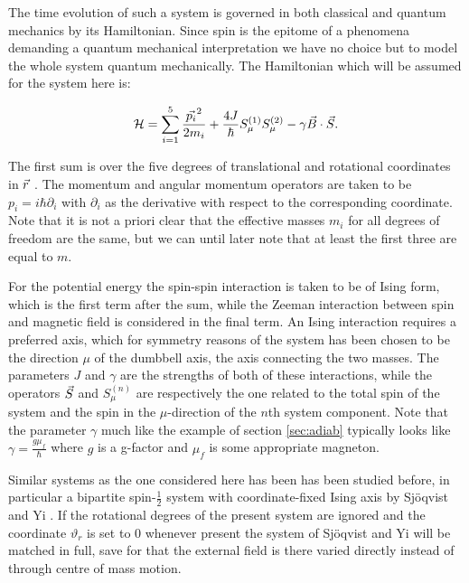 \documentclass[a4paper]{article}
\begin{document}
The time evolution of such a system is governed in both classical and quantum mechanics by
its Hamiltonian. Since spin is the epitome of a phenomena demanding a quantum mechanical
interpretation we have no choice but to model the whole system quantum mechanically. %
The Hamiltonian which will be assumed for the system here is:

\begin{equation}\label{eq:Hamil0}
        \mathbb{\cal H} = \sum_{i=1}^{5} \frac{\vec{p_i}^2}{2m_i} +
        \frac{4J}{\hbar{}}S^{(1)}_{\mu}S^{(2)}_{\mu} -
        \gamma\vec{B}\cdot \vec{S}.
\end{equation}

The first sum is over the five degrees of translational and rotational coordinates in \(\vec{r}\)
. The momentum and angular
momentum operators are
taken to be \(p_i = i\hbar \partial_i\label{def:mom}\) with \(\partial_i\) as the derivative with respect
to the
corresponding coordinate. Note that it is not a priori clear that the effective masses
\(m_i\) for
all degrees of freedom are the same, but we can until later note that at least the first
three are equal to \(m\).

For the potential energy the spin-spin interaction is taken to be of Ising form, which is
the first term after the sum, while the Zeeman interaction between spin and magnetic field is
considered in the final term. %
An Ising interaction requires a preferred axis, which for symmetry reasons
of the system has been chosen to be the direction \(\mu\) of the dumbbell axis, the axis connecting
the two masses.
 The parameters \(J\) and \(\gamma\) are the strengths of both
of these interactions, while the operators \(\vec{S}\) and \(S^{(n)}_{\mu}\) are respectively
the one
related to the total spin of the system and the spin in the \(\mu\)-direction of the \(n\)th system
component. Note that the parameter \(\gamma\) much like the example of section
\ref{sec:adiab} typically looks like \(\gamma = \frac{g\mu_f}{\hbar{}}\) where \(g\) is a
g-factor and \(\mu _f\) is some appropriate magneton.

Similar systems as the one considered here has been has been studied before, in particular
a bipartite spin-\(\frac{1}{2}\) system with coordinate-fixed Ising axis by Sjöqvist and Yi
\cite{yi}. If the rotational degrees of the present system are ignored and the coordinate
\(\vartheta_r\) is set to \(0\) whenever present the system of Sjöqvist and Yi will be
matched in full, save for that the external field is there varied directly instead of
through centre of mass motion.
\end{document}
